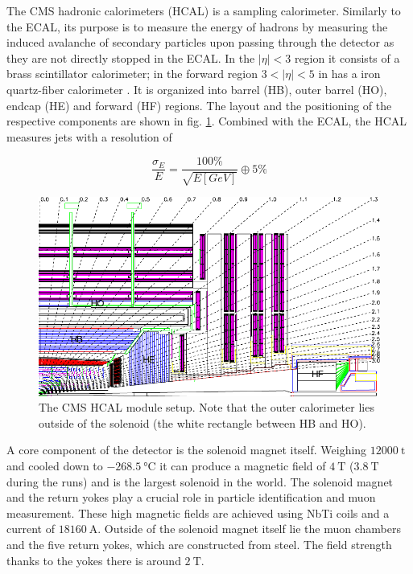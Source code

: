 

The CMS hadronic calorimeters (HCAL) is a sampling calorimeter. Similarly to the ECAL, its purpose is to measure the energy of hadrons by measuring the induced avalanche of secondary particles upon passing through the detector as they are not directly stopped in the ECAL. In the $|\eta|<3$ region it consists of a brass scintillator calorimeter; in the forward region $3<|\eta|<5$ in has a iron quartz-fiber calorimeter \cite{canko_ak_2009}. It is organized into barrel (HB), outer barrel (HO), endcap (HE) and forward (HF) regions. The layout and the positioning of the respective components are shown in fig. \ref{fig:hcal}. Combined with the ECAL, the HCAL measures jets with a resolution of \cite{Lopez}

\begin{equation*}
	\frac{\sigma_E}{E} = \frac{100\%}{\sqrt{E\left[GeV\right]}} \oplus 5\%
\end{equation*}

\begin{figure}[h!]
	\centering
	\includegraphics[width=0.8\linewidth]{figures/experiment/hcal.pdf}
	\caption{The CMS HCAL module setup. Note that the outer calorimeter lies outside of the solenoid (the white rectangle between HB and HO). \cite{Chatrchyan:1129810}}
	\label{fig:hcal}
\end{figure}


A core component of the detector is the solenoid magnet itself. Weighing $\SI{12000}{\tonne}$ and cooled down to $\SI{-268.5}{\degreeCelsius}$ it can produce a magnetic field of $\SI{4}{\tesla}$ ($\SI{3.8}{\tesla}$ during the runs) and is the largest solenoid in the world. The solenoid magnet and the return yokes play a crucial role in particle identification and muon measurement. These high magnetic fields are achieved using NbTi coils and a current of $\SI{18160}{\ampere}$. Outside of the solenoid magnet itself lie the muon chambers and the five return yokes, which are constructed from steel. The field strength thanks to the yokes there is around $\SI{2}{\tesla}$.


